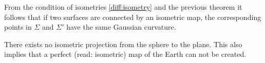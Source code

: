 	\begin{property}
    		From the condition of isometries \ref{diff:isometry} and the previous theorem it follows that if two surfaces are connected by an isometric map, the corresponding points in $\Sigma$ and $\Sigma'$ have the same Gaussian curvature.
	\end{property}
	\begin{result}
		There exists no isometric projection from the sphere to the plane. This also implies that a perfect (read: isometric) map of the Earth can not be created.
	\end{result}
